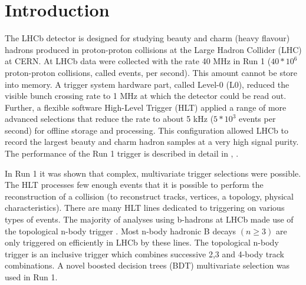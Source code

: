 \documentclass{llncs}
\begin{document}


\section{Introduction}
The LHCb detector \cite{detector} is designed for studying beauty and charm (heavy flavour) hadrons produced in proton-proton collisions at the Large Hadron Collider (LHC) at CERN.
At LHCb data were collected with the rate 40 MHz in Run 1 ($40*10^6$ proton-proton collisions, called events, per second). This amount cannot be store into memory. A trigger system hardware part, called Level-0 (L0), reduced the visible bunch crossing rate to 1 MHz at which the detector could be read out. Further, a flexible software High-Level Trigger (HLT) applied a range of more advanced selections that reduce the rate to about 5 kHz ($5 * 10^3$ events per second) for offline storage and processing. This configuration allowed LHCb to record the largest beauty and charm hadron samples at a very high signal purity. The performance of the Run 1 trigger is described in detail in \cite{run1_1}, \cite{run1_2}.

In Run 1 it was shown that complex, multivariate trigger selections were possible. The HLT processes few enough events that it is possible to perform the reconstruction of a collision (to reconstruct tracks, vertices, a topology, physical characteristics). There are many HLT lines dedicated to triggering on various types of events. The majority of analyses using b-hadrons at LHCb made use of the topological n-body trigger \cite{run1_topo}. Most n-body hadronic B decays $(n \geq 3)$ are only triggered on efficiently in LHCb by these lines. The topological n-body trigger is an inclusive trigger which combines successive 2,3 and 4-body track combinations. A novel boosted decision trees (BDT) multivariate selection \cite{bbdt} was used in Run 1. 
\end{document}
